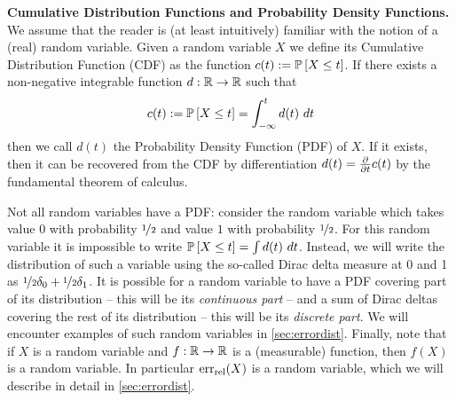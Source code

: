 \noindent \textbf{Cumulative Distribution Functions and Probability Density Functions.}
We assume that the reader is (at least intuitively) familiar with the notion of a (real) random variable. Given a random variable $X$ we define its Cumulative Distribution Function (CDF) as the function $c(t)\mathrel{:=}\mathbb{P}\left[ X\leq t \right]$. If there exists a non-negative integrable function $d: \mathbb{R}\to\mathbb{R}$ such that
\begin{align*}
c(t)\mathrel{:=}\mathbb{P}\left[ X\leq t \right]=\int_{-\infty}^t d(t)~dt
\end{align*}
then we call $d(t)$ the Probability Density Function (PDF) of $X$.  If it exists,  then it can be recovered from the CDF by differentiation $d(t)=\frac{\partial}{\partial t} c(t)$  by the fundamental theorem of calculus.  

Not all random variables have a PDF: consider the random variable which takes value $0$ with probability $\nicefrac{1}{2}$ and value $1$ with probability $\nicefrac{1}{2}$. For this random variable it is impossible to write $\mathbb{P}\left[ X\leq t \right]=\int d(t)~dt$. Instead, we will write the distribution of such a variable using the so-called Dirac delta measure at 0 and 1 as $\nicefrac{1}{2}\delta_0 + \nicefrac{1}{2}\delta_1$.  It is possible for a random variable to have a PDF covering part of its distribution -- this will be its \emph{continuous part} -- and a sum of Dirac deltas covering the rest of its distribution -- this will be its \emph{discrete part}. We will encounter examples of such random variables in \cref{sec:errordist}. Finally, note that if $X$ is a random variable and $f: \mathbb{R}\to\mathbb{R}$ is a (measurable) function, then $f(X)$ is a random variable.  In particular $\mathrm{err}_{\mathrm{rel}}(X)$ is a random variable, which we will describe in  detail in \cref{sec:errordist}.

